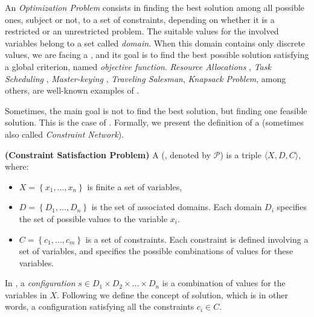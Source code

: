 An \textit{Optimization Problem} consists in finding the best solution among all possible ones, subject or not, to a set of constraints, depending on whether it is a restricted or an unrestricted problem. The suitable values for the involved variables belong to a set called {\it domain}. When this domain contains only discrete values, we are facing a \COP, and its goal is to find the best possible solution satisfying a global criterion, named {\it objective function}. {\it Resource Allocations} \cite{Akplogan2011}, \textit{Task Scheduling} \cite{Sibbesen2008}, \textit{Master-keying} \cite{Espelage2000}, \textit{Traveling Salesman}, \textit{Knapsack Problem}, among others, are well-known examples of \COPs{} \cite{Smith2005}.

Sometimes, the main goal is not to find the best solution, but finding one feasible solution. This is the case of \CSPs. Formally, we present the definition of a \csp{} (sometimes also called \textit{Constraint Network}). 

\begin{definition}{\bf (Constraint Satisfaction Problem)}
\label{def:csp}
A \CSP{} (\csp, denoted by $\mathcal{P}$) is a triple $\langle X,D,C \rangle$, where:
\begin{itemize}
\item $X = \left\{x_1,\ldots,x_n\right\}$ is finite a set of variables,
\item $D = \left\{D_1,\ldots, D_n\right\}$ is the set of associated domains. Each domain $D_i$ specifies the set of possible values to the variable $x_i$. %
\item $C = \left\{c_1,\ldots, c_m\right\}$ is a set of constraints. Each constraint is defined involving a set of variables, and specifies the possible combinations of values for these variables.
\end{itemize}
\end{definition}


In \csps, a \textit{configuration} $s\in D_1\times D_2\times\dots\times D_n$ is a combination of values for the variables in $X$. Following we define the concept of solution, which is in other words, a configuration satisfying all the constraints $c_i \in C$.

